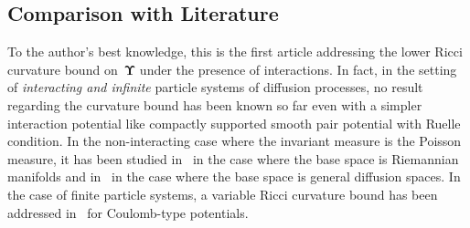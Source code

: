 \documentclass[11pt,letterpaper]{amsart}
\newcommand{\dom}[1]{\mathcal D(#1)}
\newcommand{\comma}{\,\,\mathrm{,}\;\,}
\newcommand{\fstop}{\,\,\mathrm{.}}
\newcommand{\cdc}{\Gamma}
\newcommand{\QP}{{\mu}}
\newcommand{\dUpsilon}{{\mathbf \Upsilon}}
\newcommand{\U}{\dUpsilon}
\newcommand{\E}{\mathcal E}
\renewcommand{\1}{\mathbf 1}
\numberwithin{equation}{section}
\theoremstyle{plain}
\theoremstyle{definition}
\theoremstyle{remark}
\begin{document}
%

\subsection*{Comparison with Literature}
To the author's best knowledge, this is the first article addressing the lower Ricci curvature bound on~$\U$ under the presence of interactions. In fact, in the setting of {\it interacting and infinite} particle systems of diffusion processes, no result regarding the curvature bound  has been known so far even with a simpler interaction potential like compactly supported smooth pair potential with Ruelle condition. In the non-interacting case where the invariant measure is the Poisson measure, it has been studied in~\cite{ErbHue15} in the case where the base space is Riemannian manifolds and in~\cite{LzDSSuz22} in the case where the base space is general diffusion spaces. In the case of finite particle systems, a variable Ricci curvature bound has been addressed in~\cite{GyuVon20} for Coulomb-type potentials. 
\end{document}
